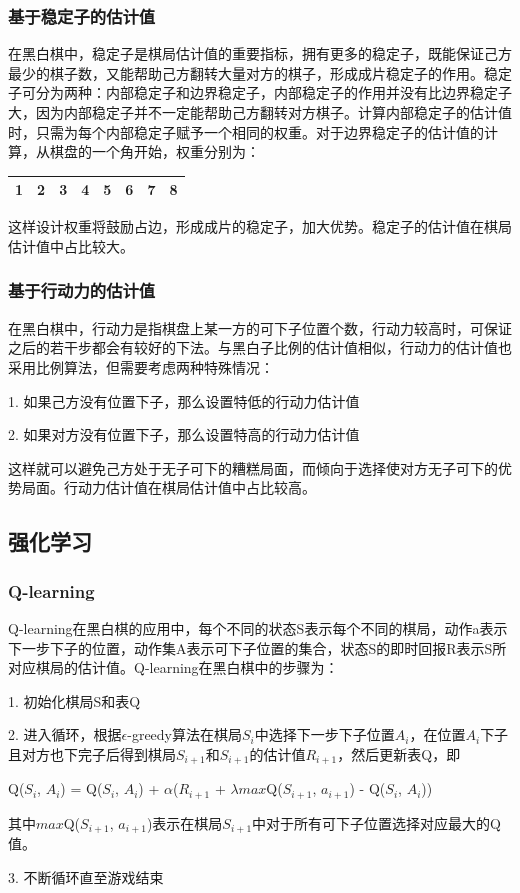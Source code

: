 \documentclass{article}
\begin{document}
\subsubsection{基于稳定子的估计值}
在黑白棋中，稳定子是棋局估计值的重要指标，拥有更多的稳定子，既能保证己方最少的棋子数，又能帮助己方翻转大量对方的棋子，形成成片稳定子的作用。稳定子可分为两种：内部稳定子和边界稳定子，内部稳定子的作用并没有比边界稳定子大，因为内部稳定子并不一定能帮助己方翻转对方棋子。计算内部稳定子的估计值时，只需为每个内部稳定子赋予一个相同的权重。对于边界稳定子的估计值的计算，从棋盘的一个角开始，权重分别为：
\begin{center}
    \begin{tabular}{|c|c|c|c|c|c|c|c|}
        \hline 1&2&3&4&5&6&7&8 \\
        \hline
    \end{tabular}
\end{center}
\par
这样设计权重将鼓励占边，形成成片的稳定子，加大优势。稳定子的估计值在棋局估计值中占比较大。

\subsubsection{基于行动力的估计值}
在黑白棋中，行动力是指棋盘上某一方的可下子位置个数，行动力较高时，可保证之后的若干步都会有较好的下法。与黑白子比例的估计值相似，行动力的估计值也采用比例算法，但需要考虑两种特殊情况：
\par
1. 如果己方没有位置下子，那么设置特低的行动力估计值
\par
2. 如果对方没有位置下子，那么设置特高的行动力估计值
\par
这样就可以避免己方处于无子可下的糟糕局面，而倾向于选择使对方无子可下的优势局面。行动力估计值在棋局估计值中占比较高。

\subsection{强化学习}
\subsubsection{Q-learning\cite{r1}}
Q-learning在黑白棋的应用中，每个不同的状态S表示每个不同的棋局，动作a表示下一步下子的位置，动作集A表示可下子位置的集合，状态S的即时回报R表示S所对应棋局的估计值。Q-learning在黑白棋中的步骤为：
\par
1. 初始化棋局S和表Q
\par
2. 进入循环，根据$\epsilon$-greedy算法在棋局$S_i$中选择下一步下子位置$A_i$，在位置$A_i$下子且对方也下完子后得到棋局$S_{i+1}$和$S_{i+1}$的估计值$R_{i+1}$，然后更新表Q，即
\begin{center}
    {Q($S_i$, $A_i$) = Q($S_i$, $A_i$) + $\alpha$($R_{i+1}$ + $\lambda$$max$Q($S_{i+1}$, $a_{i+1}$) - Q($S_i$, $A_i$))}
\end{center}
\par
其中$max$Q($S_{i+1}$, $a_{i+1}$)表示在棋局$S_{i+1}$中对于所有可下子位置选择对应最大的Q值。
\par
3. 不断循环直至游戏结束
\end{document}
